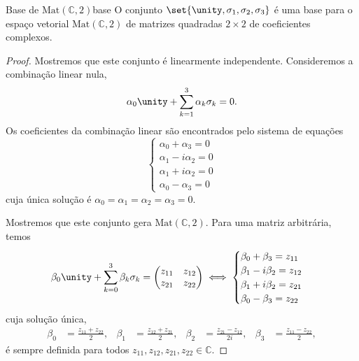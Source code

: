 \begin{proposition}{Base de \(\mathrm{Mat}(\mathbb{C}, 2)\)}{base}
    O conjunto \(\set{\unity, \sigma_1, \sigma_2, \sigma_3}\) é uma base para o espaço vetorial \(\mathrm{Mat}(\mathbb{C}, 2)\) de matrizes quadradas \(2\times 2\) de coeficientes complexos.
\end{proposition}
\begin{proof}
    Mostremos que este conjunto é linearmente independente. Consideremos a combinação linear nula,
    \begin{equation*}
        \alpha_0 \unity + \sum_{k=1}^3\alpha_k \sigma_k = 0.
    \end{equation*}
    Os coeficientes da combinação linear são encontrados pelo sistema de equações
    \begin{equation*}
        \begin{cases}
            \alpha_0 + \alpha_3 = 0\\
            \alpha_1 - i \alpha_2 = 0\\
            \alpha_1 + i \alpha_2 = 0\\
            \alpha_0 - \alpha_3 = 0
        \end{cases}
    \end{equation*}
    cuja única solução é \(\alpha_0 = \alpha_1 = \alpha_2 = \alpha_3 = 0\).

    Mostremos que este conjunto gera \(\mathrm{Mat}(\mathbb{C}, 2)\). Para uma matriz arbitrária, temos
    \begin{equation*}
        \beta_0 \unity + \sum_{k = 0}^3 \beta_k \sigma_k = \begin{pmatrix}
            z_{11}&z_{12}\\z_{21}&z_{22}
        \end{pmatrix}
        \iff
        \begin{cases}
            \beta_0 + \beta_3 = z_{11}\\
            \beta_1 - i \beta_2 = z_{12}\\
            \beta_1 + i \beta_2 = z_{21}\\
            \beta_0 - \beta_3 = z_{22}
        \end{cases}
    \end{equation*}
    cuja solução única,
    \begin{align*}
        \beta_0 &= \frac{z_{11} + z_{22}}{2},&
        \beta_1 &= \frac{z_{12} + z_{21}}{2},&
        \beta_2 &= \frac{z_{21} - z_{12}}{2i},&
        \beta_3 &= \frac{z_{11} - z_{22}}{2},
    \end{align*}
    é sempre definida para todos \(z_{11}, z_{12}, z_{21}, z_{22} \in \mathbb{C}\).
\end{proof}

